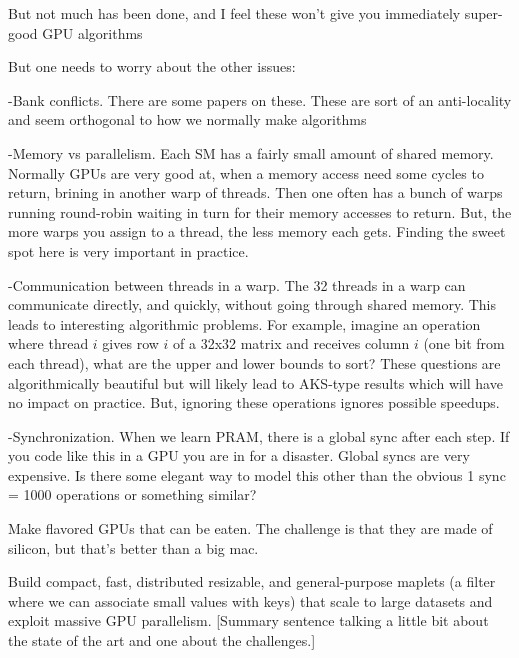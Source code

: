 But not much has been done, and I feel these won't give you immediately super-good GPU algorithms

But one needs to worry about the other issues:

-Bank conflicts. There are some papers on these. These are sort of an anti-locality and seem orthogonal to how we normally make algorithms

-Memory vs parallelism. Each SM has a fairly small amount of shared memory. Normally GPUs are very good at, when a memory access need some cycles to return, brining in another warp of threads. Then one often has a bunch of warps running round-robin waiting in turn for their memory accesses to return. But, the more warps you assign to a thread, the less memory each gets. Finding the sweet spot here is very important in practice.

-Communication between threads in a warp. The 32 threads in a warp can communicate directly, and quickly, without going through shared memory. This leads to interesting algorithmic problems. For example, imagine an operation where thread $i$ gives row $i$ of a 32x32 matrix and receives column $i$ (one bit from each thread), what are the upper and lower bounds to sort? These questions are algorithmically beautiful but will likely lead to AKS-type results which will have no impact on practice. But, ignoring these operations ignores possible speedups.

-Synchronization. When we learn PRAM, there is a global sync after each step. If you code like this in a GPU you are in for a disaster. Global syncs are very expensive. Is there some elegant way to model this other than the obvious 1 sync = 1000 operations or something similar?



\begin{rproblem}
Make flavored GPUs that can be eaten. The challenge is that they are made of silicon, but that's better than a big mac.  
\label{rprob:peppermint}
\end{rproblem}

\begin{rproblem}
Build compact, fast, distributed resizable, and general-purpose maplets (a filter where we can associate small values with keys) that scale to large datasets and exploit massive GPU parallelism. 
[Summary sentence talking a little bit about the state of the art and one about the challenges.]
\label{rprob:peppermint}
\end{rproblem}


